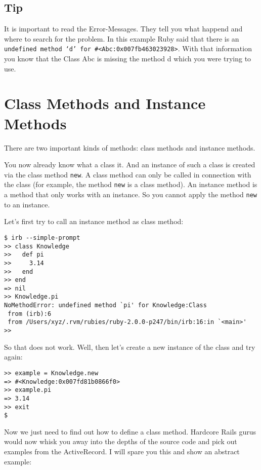 \documentclass[a4paper]{book}
\newcommand{\chap}[1]{\newpage\thispagestyle{empty}\chapter{#1}\label{chap:\thechapter}}
\begin{document}
\section{Tip}\label{tip-1}

It is important to read the Error-Messages. They tell you what happend and where to search for the problem. In this example Ruby said that there is an \texttt{undefined method `d' for             \#\textless{}Abc:0x007fb463023928\textgreater{}}. With that information you know that the Class Abc is missing the method d which you were trying to use.

\chap{Class Methods and Instance Methods}\label{class-methods-and-instance-methods}

There are two important kinds of methods: class methods and instance methods.

You now already know what a class it. And an instance of such a class is created via the class method \texttt{new}. A class method can only be called in connection with the class (for example, the method \texttt{new} is a class method). An instance method is a method that only works with an instance. So you cannot apply the method \texttt{new} to an instance.

Let's first try to call an instance method as class method:

\begin{shaded}\begin{verbatim}
$ irb --simple-prompt
>> class Knowledge
>>   def pi
>>     3.14
>>   end
>> end
=> nil
>> Knowledge.pi
NoMethodError: undefined method `pi' for Knowledge:Class
 from (irb):6
 from /Users/xyz/.rvm/rubies/ruby-2.0.0-p247/bin/irb:16:in `<main>'
>>
\end{verbatim}\end{shaded}

So that does not work. Well, then let's create a new instance of the class and try again:

\begin{shaded}\begin{verbatim}
>> example = Knowledge.new
=> #<Knowledge:0x007fd81b0866f0>
>> example.pi
=> 3.14
>> exit
$
\end{verbatim}\end{shaded}

Now we just need to find out how to define a class method. Hardcore Rails gurus would now whisk you away into the depths of the source code and pick out examples from the ActiveRecord. I will spare you this and show an abstract example:
\end{document}
